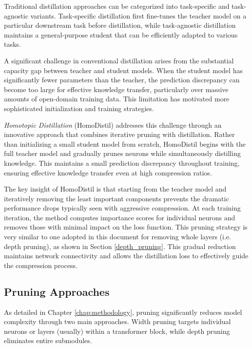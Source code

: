 Traditional distillation approaches can be categorized into task-specific and task-agnostic variants. Task-specific distillation first fine-tunes the teacher model on a particular downstream task before distillation, while task-agnostic distillation maintains a general-purpose student that can be efficiently adapted to various tasks.

A significant challenge in conventional distillation arises from the substantial capacity gap between teacher and student models. When the student model has significantly fewer parameters than the teacher, the prediction discrepancy can become too large for effective knowledge transfer, particularly over massive amounts of open-domain training data. This limitation has motivated more sophisticated initialization and training strategies.

\textit{Homotopic Distillation} (HomoDistil) \cite{homodistil} addresses this challenge through an innovative approach that combines iterative pruning with distillation. Rather than initializing a small student model from scratch, HomoDistil begins with the full teacher model and gradually prunes neurons while simultaneously distilling knowledge. This maintains a small prediction discrepancy throughout training, ensuring effective knowledge transfer even at high compression ratios.

The key insight of HomoDistil is that starting from the teacher model and iteratively removing the least important components prevents the dramatic performance drops typically seen with aggressive compression. At each training iteration, the method computes importance scores for individual neurons and removes those with minimal impact on the loss function. This pruning strategy is very similar to one adopted in this document for removing whole layers (i.e. depth pruning), as shown in Section \ref{depth_pruning}. This gradual reduction maintains network connectivity and allows the distillation loss to effectively guide the compression process.

\subsection{Pruning Approaches}

As detailed in Chapter \ref{chap:methodology}, pruning significantly reduces model complexity through two main approaches. Width pruning targets individual neurons or layers (usually) within a transformer block, while depth pruning eliminates entire submodules.

